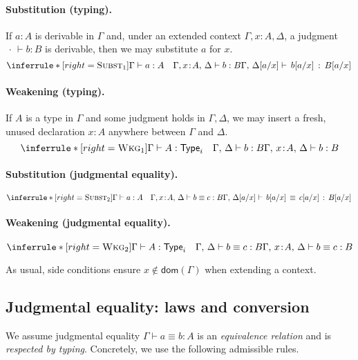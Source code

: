 \documentclass{article}
\newcommand{\Type}{\ensuremath{\mathsf{Type}}}
\newcommand{\judg}[3]{#1 \vdash #2 : #3}   %
\newcommand{\jdeq}{\equiv}                 %
\newcommand{\teq}[4]{#1 \vdash #2 \jdeq #3 : #4} %
\newcommand{\dom}{\mathsf{dom}}            %
\newcommand{\rulename}[1]{\textsc{#1}}
\begin{document}
\paragraph{Substitution (typing).}
If \(a:A\) is derivable in \(\Gamma\) and, under an extended context \(\Gamma,x\!:\!A,\Delta\), a judgment \(\judg{\,\cdot\,}{b}{B}\) is derivable, then we may substitute \(a\) for \(x\).
\[
\inferrule*[right=\rulename{Subst\(_1\)}]{
  \judg{\Gamma}{a}{A}
  \quad
  \judg{\Gamma,x\!:\!A,\,\Delta}{b}{B}
}{
  \judg{\Gamma,\,\Delta[a/x]}{\,b[a/x]\,}{\,B[a/x]\,}
}
\]

\paragraph{Weakening (typing).}
If \(A\) is a type in \(\Gamma\) and some judgment holds in \(\Gamma,\Delta\), we may insert a fresh, unused declaration \(x\!:\!A\) anywhere between \(\Gamma\) and \(\Delta\).
\[
\inferrule*[right=\rulename{Wkg\(_1\)}]{
  \judg{\Gamma}{A}{\Type_i}
  \quad
  \judg{\Gamma,\,\Delta}{b}{B}
}{
  \judg{\Gamma,\,x\!:\!A,\,\Delta}{b}{B}
}
\]

\paragraph{Substitution (judgmental equality).}
\[
\inferrule*[right=\rulename{Subst\(_2\)}]{
  \judg{\Gamma}{a}{A}
  \quad
  \teq{\Gamma,x\!:\!A,\,\Delta}{b}{c}{B}
}{
  \teq{\Gamma,\,\Delta[a/x]}{\,b[a/x]\,}{\,c[a/x]\,}{\,B[a/x]\,}
}
\]

\paragraph{Weakening (judgmental equality).}
\[
\inferrule*[right=\rulename{Wkg\(_2\)}]{
  \judg{\Gamma}{A}{\Type_i}
  \quad
  \teq{\Gamma,\,\Delta}{b}{c}{B}
}{
  \teq{\Gamma,\,x\!:\!A,\,\Delta}{b}{c}{B}
}
\]

\medskip
As usual, side conditions ensure \(x\notin\dom(\Gamma)\) when extending a context.

\subsection*{Judgmental equality: laws and conversion}

We assume judgmental equality \(\teq{\Gamma}{a}{b}{A}\) is an \emph{equivalence relation} and is \emph{respected by typing}. Concretely, we use the following admissible rules.
\end{document}
